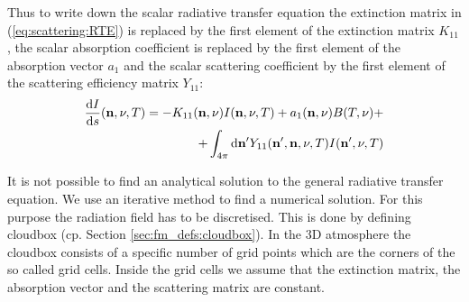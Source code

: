 Thus to write down the scalar radiative transfer equation the
extinction matrix in (\ref{eq:scattering:RTE}) is replaced by the
first element of the extinction matrix
$K_{11}$, the scalar absorption coefficient is replaced by the first
element of the absorption vector $a_1$ and the scalar scattering
coefficient by the first element of the scattering efficiency matrix
$Y_{11}$:
\begin{eqnarray}
  \label{eq:scattering:scalar_rte}
\frac{\mathrm{d} I}{\mathrm{d} s} ({\bf n}, \nu, T) = -K_{11}({\bf n}, \nu)I
({\bf n}, \nu, T) + a_1({\bf n}, \nu)B(T,\nu) + \\ \nonumber
 +\int_{4\pi} \mathrm{d} {\bf n}^\prime Y_{11}({\bf n}^\prime, {\bf n}, \nu, T) I({\bf n}^\prime,
  \nu, T)
\end{eqnarray}

\label{sec:scattering:solution_rte}

It is not possible to find an analytical solution to the general
radiative transfer equation. We use an iterative method to find a
numerical solution. For this purpose the radiation field has to be
discretised. This is done by defining cloudbox (cp. Section
\ref{sec:fm_defs:cloudbox}). In the 3D atmosphere the cloudbox
consists of a specific number of grid points which are the corners of
the so called grid cells. Inside the grid cells we assume that the
extinction matrix, the absorption vector and the scattering matrix are
constant. 

